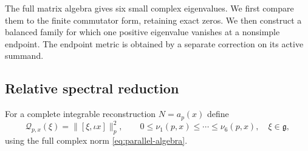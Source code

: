 \documentclass[11pt]{amsart}
\theoremstyle{definition}
\theoremstyle{remark}
\newcommand{\cQ}{\mathcal Q}
\begin{document}
The full matrix algebra gives six small complex eigenvalues. We first
compare them to the finite commutator form, retaining exact zeros.
We then construct a balanced family for which one positive eigenvalue
vanishes at a nonsimple endpoint. The endpoint metric is obtained by
a separate correction on its active summand.

\subsection{Relative spectral reduction}\label{subsec:spectral-reduction}
For a complete integrable reconstruction $N=a_p(x)$ define
\begin{equation}\label{eq:finite-spectrum}
 \cQ_{p,x}(\xi)=\|[\xi,\iota x]\|_p^2,\qquad
 0\le\nu_1(p,x)\le\cdots\le\nu_6(p,x),
 \quad \xi\in\mathfrak g,
\end{equation}
using the full complex norm \eqref{eq:parallel-algebra}.
\end{document}
